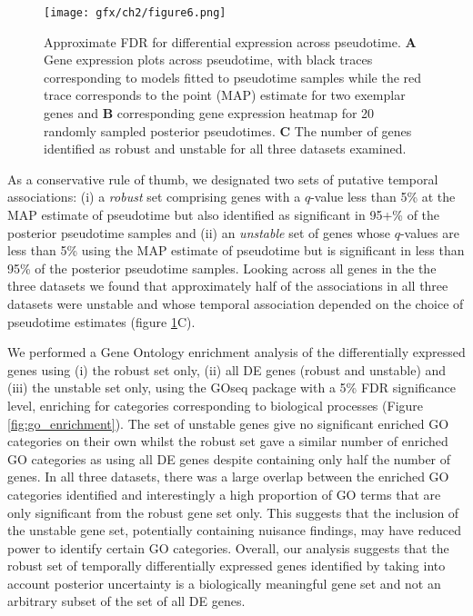 \begin{figure}
	\centering
	\texttt{[image: gfx/ch2/figure6.png]}
\caption{ Approximate FDR for differential expression across pseudotime.
\textbf{A} Gene expression plots across pseudotime, with black traces corresponding to models fitted to pseudotime samples while the red trace corresponds to the point (MAP) estimate for two exemplar genes and \textbf{B} corresponding gene expression heatmap for 20 randomly sampled posterior pseudotimes.
\textbf{C} The number of genes identified as robust and unstable for all three datasets examined.}
\label{fig:afdr}
\end{figure}

As a conservative rule of thumb, we designated two sets of putative temporal associations: (i) a \emph{robust} set comprising genes with a $q$-value less than 5\% at the MAP estimate of pseudotime but also identified as significant in 95+\% of the posterior pseudotime samples and (ii) an \emph{unstable} set of genes whose $q$-values are less than 5\% using the MAP estimate of pseudotime but is significant in less than 95\% of the posterior pseudotime samples. Looking across all genes in the the three datasets we found that approximately half of the associations in all three datasets were unstable and whose temporal association depended on the choice of pseudotime estimates (figure \ref{fig:afdr}C).

We performed a Gene Ontology enrichment analysis of the differentially expressed genes using (i) the robust set only, (ii) all DE genes (robust and unstable) and (iii) the unstable set only, using the GOseq package \cite{young2010gene} with a 5\% FDR significance level, enriching for categories corresponding to biological processes (Figure \ref{fig:go_enrichment}). The set of unstable genes give no significant enriched GO categories on their own whilst the robust set gave a similar number of enriched GO categories as using all DE genes despite containing only half the number of genes. In all three datasets, there was a large overlap between the enriched GO categories identified and interestingly a high proportion of GO terms that are only significant from the robust gene set only. This suggests that the inclusion of the unstable gene set, potentially containing nuisance findings, may have reduced power to identify certain GO categories. Overall, our analysis suggests that the robust set of temporally differentially expressed genes identified by taking into account posterior uncertainty is a biologically meaningful gene set and not an arbitrary subset of the set of all DE genes.


